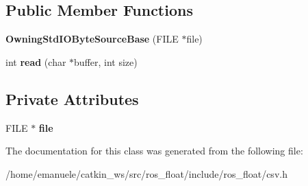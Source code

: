 \subsection*{Public Member Functions}
\begin{DoxyCompactItemize}
\item 
\mbox{\label{classio_1_1detail_1_1OwningStdIOByteSourceBase_a259f77d1a3c57720b54b88d9f8a3c018}} 
{\bfseries Owning\+Std\+I\+O\+Byte\+Source\+Base} (F\+I\+LE $\ast$file)
\item 
\mbox{\label{classio_1_1detail_1_1OwningStdIOByteSourceBase_a9269e7bfd07ebf2fa3518912fe7bebd0}} 
int {\bfseries read} (char $\ast$buffer, int size)
\end{DoxyCompactItemize}
\subsection*{Private Attributes}
\begin{DoxyCompactItemize}
\item 
\mbox{\label{classio_1_1detail_1_1OwningStdIOByteSourceBase_a00f62c8522d0fe9edadf3d094e94ae26}} 
F\+I\+LE $\ast$ {\bfseries file}
\end{DoxyCompactItemize}


The documentation for this class was generated from the following file\+:\begin{DoxyCompactItemize}
\item 
/home/emanuele/catkin\+\_\+ws/src/ros\+\_\+float/include/ros\+\_\+float/csv.\+h\end{DoxyCompactItemize}
